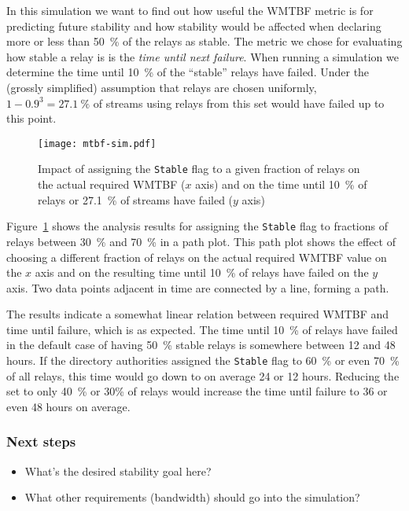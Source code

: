 \documentclass{article}
\begin{document}
In this simulation we want to find out how useful the WMTBF metric is for
predicting future stability and how stability would be affected when
declaring more or less than 50~\% of the relays as stable.
The metric we chose for evaluating how stable a relay is is the \emph{time
until next failure}.
When running a simulation we determine the time until 10~\% of the
``stable'' relays have failed.
Under the (grossly simplified) assumption that relays are chosen
uniformly, $1 - 0.9^3 = 27.1~\%$ of streams using relays from this set
would have failed up to this point.

\begin{figure}[t]
\texttt{[image: mtbf-sim.pdf]}
\caption{Impact of assigning the \texttt{Stable} flag to a given fraction
of relays on the actual required WMTBF ($x$ axis) and on the time
until 10~\% of relays or 27.1~\% of streams have failed ($y$ axis)}
\label{fig:mtbf-sim}
\end{figure}

Figure~\ref{fig:mtbf-sim} shows the analysis results for assigning the
\texttt{Stable} flag to fractions of relays between 30~\% and 70~\% in a
path plot.
This path plot shows the effect of choosing a different fraction of
relays on the actual required WMTBF value on the $x$ axis and on the
resulting time until 10~\% of relays have failed on the $y$ axis.
Two data points adjacent in time are connected by a line, forming a path.

The results indicate a somewhat linear relation between required WMTBF and
time until failure, which is as expected.
The time until 10~\% of relays have failed in the default case of having
50~\% stable relays is somewhere between 12 and 48 hours.
If the directory authorities assigned the \texttt{Stable} flag to 60~\% or
even 70~\% of all relays, this time would go down to on average 24 or 12
hours.
Reducing the set to only 40~\% or 30\% of relays would increase the time
until failure to 36 or even 48 hours on average.

\subsubsection*{Next steps}

{\it
\begin{itemize}
\item What's the desired stability goal here?
\item What other requirements (bandwidth) should go into the simulation?
\end{itemize}
}
\end{document}
